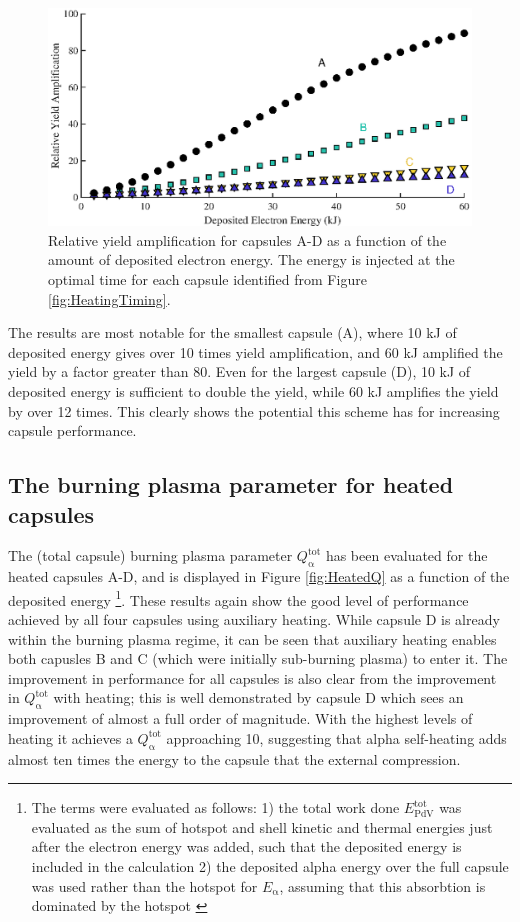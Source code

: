 \begin{figure}[ht]
\centering
\includegraphics{figures/FurtherSims/HeatingPower.eps}
\caption{Relative yield amplification for capsules A-D as a function of the amount of deposited electron energy. The energy is injected at the optimal time for each capsule identified from Figure \ref{fig:HeatingTiming}.}
\label{fig:HeatingPower}
\end{figure}

The results are most notable for the smallest capsule (A), where 10 kJ of deposited energy gives over 10 times yield amplification, and 60 kJ amplified the yield by a factor greater than 80. Even for the largest capsule (D), 10 kJ of deposited energy is sufficient to double the yield, while 60 kJ amplifies the yield by over 12 times. This clearly shows the potential this scheme has for increasing capsule performance.

\subsection{The burning plasma parameter for heated capsules}

The (total capsule) burning plasma parameter $Q^\mathrm{{tot}}_{\mathrm{\alpha}}$ has been evaluated for the heated capsules A-D, and is displayed in Figure \ref{fig:HeatedQ}
as a function of the deposited energy \footnote{The terms were evaluated as follows: 1) the total work done $E^\mathrm{{tot}}_{\mathrm{PdV}}$ was evaluated as the sum of hotspot and shell kinetic and thermal energies just after the electron energy was added, such that the deposited energy is included in the calculation 2) the deposited alpha energy over the full capsule was used rather than the hotspot for $E_\mathrm{\alpha}$, assuming that this absorbtion is dominated by the hotspot \cite{Christopherson2018}}. These results again show the good level of performance achieved by all four capsules using auxiliary heating. While capsule D is already within the burning plasma regime, it can be seen that auxiliary heating enables both capusles B and C (which were initially sub-burning plasma) to enter it. The improvement in performance for all capsules is also clear from the improvement in $Q^\mathrm{{tot}}_{\mathrm{\alpha}}$ with heating; this is well demonstrated by capsule D which sees an improvement of almost a full order of magnitude. With the highest levels of heating it achieves a $Q^\mathrm{{tot}}_{\mathrm{\alpha}}$ approaching 10, suggesting that alpha self-heating adds almost ten times the energy to the capsule that the external compression.

